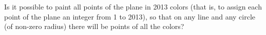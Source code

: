 \problem{}
Is it possible to paint all points of the plane in 2013 colors (that is, to assign each point of the plane an integer from 1 to 2013), so that on any line and any circle (of non-zero radius) there will be points of all the colors?
\solution
\endproblem
